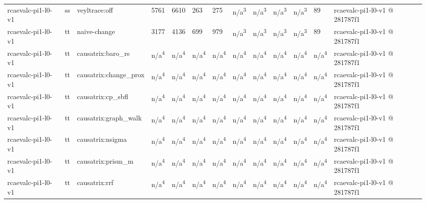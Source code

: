 \begin{table}[t]
\begin{tabular}{lllllllllllll}
rcaevalc-pi1-l0-v1 & ss & veyltrace:off & 5761 & 6610 & 263 & 275 & n/a\textsuperscript{3} & n/a\textsuperscript{3} & n/a\textsuperscript{3} & n/a\textsuperscript{3} & 89 & rcaevalc-pi1-l0-v1 @ 281787f1 \\
rcaevalc-pi1-l0-v1 & tt & naive-change & 3177 & 4136 & 699 & 979 & n/a\textsuperscript{3} & n/a\textsuperscript{3} & n/a\textsuperscript{3} & n/a\textsuperscript{3} & 89 & rcaevalc-pi1-l0-v1 @ 281787f1 \\
rcaevalc-pi1-l0-v1 & tt & causatrix:baro\_rs & n/a\textsuperscript{4} & n/a\textsuperscript{4} & n/a\textsuperscript{4} & n/a\textsuperscript{4} & n/a\textsuperscript{4} & n/a\textsuperscript{4} & n/a\textsuperscript{4} & n/a\textsuperscript{4} & n/a\textsuperscript{4} & rcaevalc-pi1-l0-v1 @ 281787f1 \\
rcaevalc-pi1-l0-v1 & tt & causatrix:change\_prox & n/a\textsuperscript{4} & n/a\textsuperscript{4} & n/a\textsuperscript{4} & n/a\textsuperscript{4} & n/a\textsuperscript{4} & n/a\textsuperscript{4} & n/a\textsuperscript{4} & n/a\textsuperscript{4} & n/a\textsuperscript{4} & rcaevalc-pi1-l0-v1 @ 281787f1 \\
rcaevalc-pi1-l0-v1 & tt & causatrix:cp\_sbfl & n/a\textsuperscript{4} & n/a\textsuperscript{4} & n/a\textsuperscript{4} & n/a\textsuperscript{4} & n/a\textsuperscript{4} & n/a\textsuperscript{4} & n/a\textsuperscript{4} & n/a\textsuperscript{4} & n/a\textsuperscript{4} & rcaevalc-pi1-l0-v1 @ 281787f1 \\
rcaevalc-pi1-l0-v1 & tt & causatrix:graph\_walk & n/a\textsuperscript{4} & n/a\textsuperscript{4} & n/a\textsuperscript{4} & n/a\textsuperscript{4} & n/a\textsuperscript{4} & n/a\textsuperscript{4} & n/a\textsuperscript{4} & n/a\textsuperscript{4} & n/a\textsuperscript{4} & rcaevalc-pi1-l0-v1 @ 281787f1 \\
rcaevalc-pi1-l0-v1 & tt & causatrix:nsigma & n/a\textsuperscript{4} & n/a\textsuperscript{4} & n/a\textsuperscript{4} & n/a\textsuperscript{4} & n/a\textsuperscript{4} & n/a\textsuperscript{4} & n/a\textsuperscript{4} & n/a\textsuperscript{4} & n/a\textsuperscript{4} & rcaevalc-pi1-l0-v1 @ 281787f1 \\
rcaevalc-pi1-l0-v1 & tt & causatrix:prism\_m & n/a\textsuperscript{4} & n/a\textsuperscript{4} & n/a\textsuperscript{4} & n/a\textsuperscript{4} & n/a\textsuperscript{4} & n/a\textsuperscript{4} & n/a\textsuperscript{4} & n/a\textsuperscript{4} & n/a\textsuperscript{4} & rcaevalc-pi1-l0-v1 @ 281787f1 \\
rcaevalc-pi1-l0-v1 & tt & causatrix:rrf & n/a\textsuperscript{4} & n/a\textsuperscript{4} & n/a\textsuperscript{4} & n/a\textsuperscript{4} & n/a\textsuperscript{4} & n/a\textsuperscript{4} & n/a\textsuperscript{4} & n/a\textsuperscript{4} & n/a\textsuperscript{4} & rcaevalc-pi1-l0-v1 @ 281787f1 \\

\end{tabular}
\end{table}

